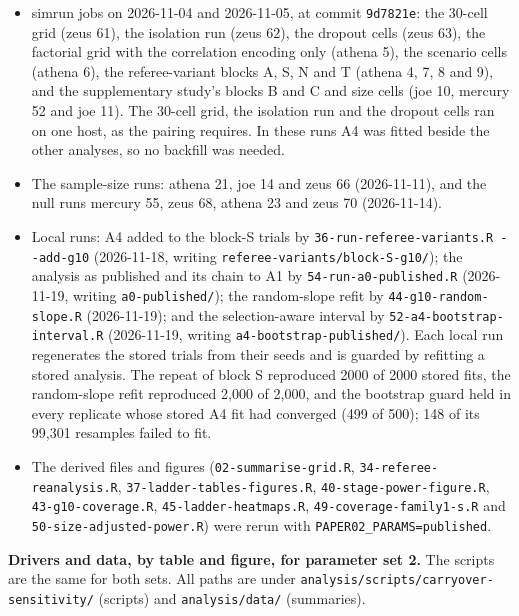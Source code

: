 \documentclass[
  11pt,
]{article}
\providecommand{\tightlist}{%
  \setlength{\itemsep}{0pt}\setlength{\parskip}{0pt}}
\begin{document}
\begin{itemize}
\tightlist
\item
  simrun jobs on 2026-11-04 and 2026-11-05, at commit \texttt{9d7821e}: the
  30-cell grid (zeus 61), the isolation run (zeus 62), the dropout
  cells (zeus 63), the factorial grid with the correlation encoding
  only (athena 5), the scenario cells (athena 6), the referee-variant
  blocks A, S, N and T (athena 4, 7, 8 and 9), and the supplementary
  study's blocks B and C and size cells (joe 10, mercury 52 and
  joe 11). The 30-cell grid, the isolation run and the dropout cells
  ran on one host, as the pairing requires. In these runs A4 was
  fitted beside the other analyses, so no backfill was needed.
\item
  The sample-size runs: athena 21, joe 14 and zeus 66 (2026-11-11),
  and the null runs mercury 55, zeus 68, athena 23 and zeus 70
  (2026-11-14).
\item
  Local runs: A4 added to the block-S trials by
  \texttt{36-run-referee-variants.R\ -\/-add-g10} (2026-11-18, writing
  \texttt{referee-variants/block-S-g10/}); the analysis as published and its
  chain to A1 by \texttt{54-run-a0-published.R} (2026-11-19, writing
  \texttt{a0-published/}); the random-slope refit by
  \texttt{44-g10-random-slope.R} (2026-11-19); and the selection-aware
  interval by \texttt{52-a4-bootstrap-interval.R} (2026-11-19, writing
  \texttt{a4-bootstrap-published/}). Each local run regenerates the stored
  trials from their seeds and is guarded by refitting a stored
  analysis. The repeat of block S reproduced
  2000 of 2000 stored fits, the
  random-slope refit reproduced
  2,000 of
  2,000, and the
  bootstrap guard held in every replicate whose stored A4 fit had
  converged (499 of 500); 148 of its 99,301 resamples failed to fit.
\item
  The derived files and figures (\texttt{02-summarise-grid.R},
  \texttt{34-referee-reanalysis.R}, \texttt{37-ladder-tables-figures.R},
  \texttt{40-stage-power-figure.R}, \texttt{43-g10-coverage.R},
  \texttt{45-ladder-heatmaps.R}, \texttt{49-coverage-family1-s.R} and
  \texttt{50-size-adjusted-power.R}) were rerun with
  \texttt{PAPER02\_PARAMS=published}.
\end{itemize}

\textbf{Drivers and data, by table and figure, for parameter set 2.} The
scripts are the same for both sets. All paths are under
\texttt{analysis/scripts/carryover-sensitivity/} (scripts) and
\texttt{analysis/data/} (summaries).
\end{document}
